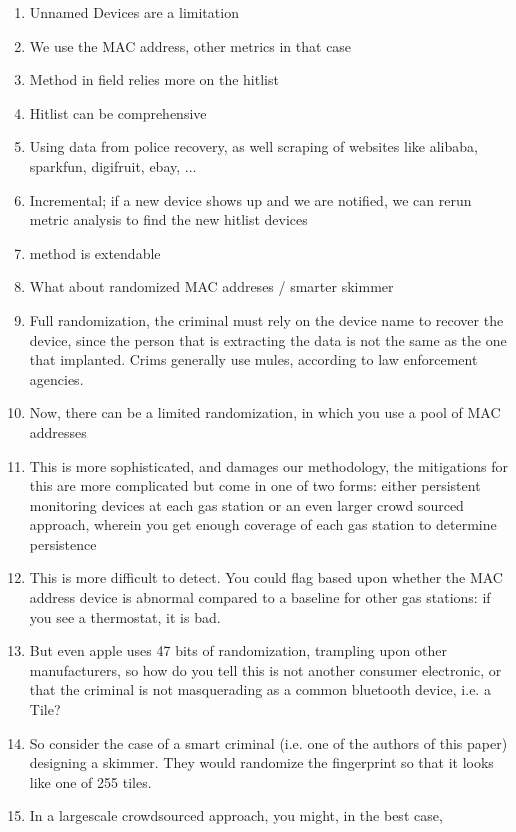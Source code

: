 \begin{enumerate}
\item  Unnamed Devices are a limitation
\item   We use the MAC address, other metrics in that case
\item   Method in field relies more on the hitlist
\item     Hitlist can be comprehensive
\item     Using data from police recovery, as well scraping of
    websites like alibaba, sparkfun, digifruit, ebay, ...
\item    	      Incremental; if a new device shows up and
	     we are notified, we can rerun metric analysis to
	     find the new hitlist devices
\item	      method is extendable
\item What about randomized MAC addreses / smarter skimmer
\item   Full randomization, the criminal must rely on the device name
  to recover the device, since the person that is extracting the
  data is not the same as the one that implanted. Crims generally
  use mules, according to law enforcement agencies.
\item   Now, there can be a limited randomization, in which you use
  a pool of MAC addresses
\item     This is more sophisticated, and damages our methodology, the
    mitigations for this are more complicated but come in one of
    two forms: either persistent monitoring devices at each gas station
    or an even larger crowd sourced approach, wherein you get enough coverage
    of each gas station to determine persistence
\item        This is more difficult to detect. You could flag based upon whether
       the MAC address device is abnormal compared to a baseline for other
       gas stations: if you see a thermostat, it is bad.
\item        But even apple uses 47 bits of randomization, trampling upon other
       manufacturers, so how do you tell this is not another consumer
       electronic, or that the criminal is not masquerading as a common
       bluetooth device, i.e. a Tile?
\item  So consider the case of a smart criminal (i.e. one of the authors of this
paper) designing a skimmer. They would randomize the fingerprint so that
it looks like one of 255 tiles.
\item    In a largescale crowdsourced approach, you might, in the best case,

\end{enumerate}
